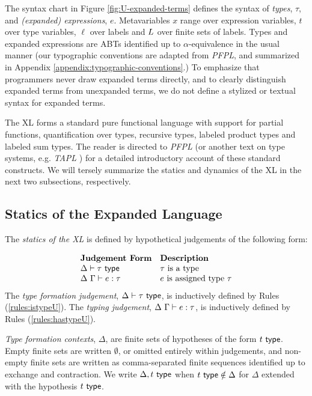 \noindent The syntax chart in Figure \ref{fig:U-expanded-terms} defines the syntax of \emph{types}, $\tau$, and \emph{(expanded) expressions}, $e$. Metavariables $x$ range over expression variables, $t$ over type variables, $\ell$ over labels and $L$ over finite sets of labels. Types and expanded expressions are ABTs identified up to $\alpha$-equivalence in the usual manner (our typographic conventions are adapted from \emph{PFPL}, and summarized in Appendix \ref{appendix:typographic-conventions}.) To emphasize that programmers never draw expanded terms directly, and to clearly distinguish expanded terms from unexpanded terms, we do not define a stylized or textual syntax for expanded terms.

The {XL} forms a standard pure functional language with support for partial functions, quantification over types, recursive types, labeled product types and labeled sum types.  The reader is directed to \emph{PFPL} \cite{pfpl} (or another text on type systems, e.g. \emph{TAPL} \cite{tapl}) for a detailed introductory account of these standard constructs. We will tersely summarize the statics and dynamics of the XL in the next two subsections, respectively.


\subsection{Statics of the Expanded Language}
The \emph{statics of the XL} is defined by hypothetical judgements of the following form:

\[\begin{array}{ll}
\textbf{Judgement Form} & \textbf{Description}\\
\Delta \vdash \tau~\mathsf{type} & \text{$\tau$ is a type}\\
\Delta~\Gamma \vdash e : \tau & \text{$e$ is assigned type $\tau$}
\end{array}\]
The \emph{type formation judgement}, $\Delta \vdash \tau~\mathsf{type}$, is inductively defined by Rules (\ref{rules:istypeU}). The \emph{typing judgement}, $\Delta~\Gamma \vdash e : \tau$, is inductively defined by Rules (\ref{rules:hastypeU}).

\emph{Type formation contexts}, $\Delta$, are finite sets of hypotheses of the form $t~\mathsf{type}$. Empty finite sets are written $\emptyset$, or omitted entirely within judgements, and non-empty finite sets are written as comma-separated finite sequences identified up to exchange and contraction. We write $\Delta, t~\mathsf{type}$ when $t~\mathsf{type} \notin \Delta$ for $\Delta$ extended with the hypothesis $t~\mathsf{type}$. %


